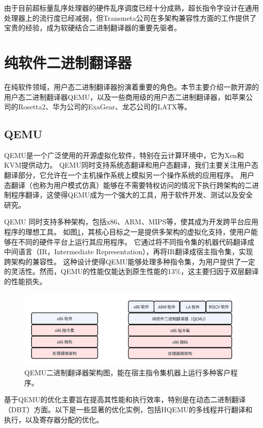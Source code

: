 由于目前超标量乱序处理器的硬件乱序调度已经十分成熟，超长指令字设计在通用处理器上的流行度已经减弱，但Transmeta公司在多架构兼容性方面的工作提供了宝贵的经验，成为软硬结合二进制翻译器的重要先驱者。

\section{纯软件二进制翻译器}

在纯软件领域，用户态二进制翻译器扮演着重要的角色。本节主要介绍一款开源的用户态二进制翻译器QEMU，以及一些商用级的用户态二进制翻译器，如苹果公司的Rosetta2、华为公司的ExaGear、龙芯公司的LATX等。

\subsection{QEMU}

QEMU是一个广泛使用的开源虚拟化软件，特别在云计算环境中，它为Xen和KVM提供动力。
QEMU同时支持系统态翻译和用户态翻译，我们主要关注用户态翻译部分，它允许在一个主机操作系统上模拟另一个操作系统的应用程序。
用户态翻译（也称为用户模式仿真）能够在不需要特权访问的情况下执行跨架构的二进制程序翻译，这使得QEMU成为一个强大的工具，用于软件开发、测试以及安全研究。

QEMU 同时支持多种架构，包括x86、ARM、MIPS等，使其成为开发跨平台应用程序的理想工具。
如图\ref{img:qemu_arch}，其核心目标之一是提供多架构的虚拟化支持，使用户能够在不同的硬件平台上运行其应用程序。
它通过将不同指令集的机器代码翻译成中间语言（IR，Intermediate Representation），再将IR翻译成宿主指令集，实现跨架构的兼容性。
这种设计使得QEMU能够处理多种指令集，为用户提供了一定的灵活性。然而，QEMU的性能仅能达到原生性能的13\%，这主要归因于双层翻译的性能损失。

\begin{figure}[h]
  \centering
  \includegraphics[width=0.8\linewidth]{./feishuImage/qemu_arch.png}
  \caption{QEMU二进制翻译器架构图，能在宿主指令集机器上运行多种客户程序。}
  \label{img:qemu_arch}
\end{figure}

基于QEMU的优化主要旨在提高其性能和执行效率，特别是在动态二进制翻译（DBT）方面。以下是一些显著的优化实例，包括HQEMU的多线程并行翻译和执行，以及寄存器分配的优化。

